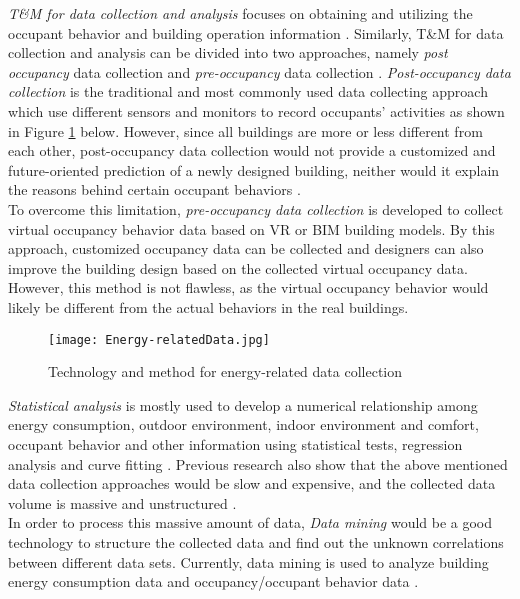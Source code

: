 			\textit{T\&M for data collection and analysis} focuses on obtaining and utilizing the occupant behavior and building operation information \cite{ZOU2018165}. Similarly, T\&M for data collection and analysis can be divided into two approaches, namely \textit{post occupancy} data collection and \textit{pre-occupancy} data collection \cite{ZOU2018165}. \textit{Post-occupancy data collection} is the traditional and most commonly used data collecting approach which use different sensors and monitors to record occupants' activities as shown in Figure \ref{fig:Energy_DataCollection} below. However, since all buildings are more or less different from each other, post-occupancy data collection would not provide a customized and future-oriented prediction of a newly designed building, neither would it explain the reasons behind certain occupant behaviors \cite{NIU2016275}.\\

			To overcome this limitation, \textit{pre-occupancy data collection} is developed to collect virtual occupancy behavior data based on VR or BIM building models. By this approach, customized occupancy data can be collected and designers can also improve the building design based on the collected virtual occupancy data. However, this method is not flawless, as the virtual occupancy behavior would likely be different from the actual behaviors in the real buildings.\\


			\begin{figure}[h!]
			\centering
			\texttt{[image: Energy-relatedData.jpg]}
			\caption{Technology and method for energy-related data collection \cite{jia2017occupancy}}
			\label{fig:Energy_DataCollection}
			\end{figure}

			\textit{Statistical analysis} is mostly used to develop a numerical relationship among energy consumption, outdoor environment, indoor environment and comfort, occupant behavior and other information using statistical tests, regression analysis and curve fitting \cite{ZOU2018165}. Previous research also show that the above mentioned data collection approaches would be slow and expensive, and the collected data volume is massive and unstructured \cite{liang2016occupancy}.\\

			In order to process this massive amount of data, \textit{Data mining} would be a good technology to structure the collected data and find out the unknown correlations between different data sets. Currently, data mining is used to analyze building energy consumption data and occupancy/occupant behavior data \cite{xiao2014data}.\\


